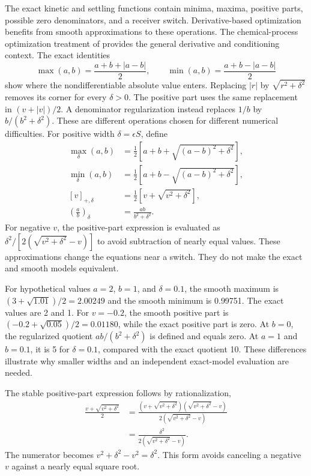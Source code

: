The exact kinetic and settling functions contain minima, maxima, positive parts, possible zero denominators, and a receiver switch. Derivative-based optimization benefits from smooth approximations to these operations. The chemical-process optimization treatment of \citet{BuzziFerraris2013} provides the general derivative and conditioning context. The exact identities
\begin{equation}
\max(a,b)=\frac{a+b+|a-b|}{2},\qquad
\min(a,b)=\frac{a+b-|a-b|}{2}
\end{equation}
show where the nondifferentiable absolute value enters. Replacing $|r|$ by $\sqrt{r^2+\delta^2}$ removes its corner for every $\delta>0$. The positive part uses the same replacement in $(v+|v|)/2$. A denominator regularization instead replaces $1/b$ by $b/(b^2+\delta^2)$. These are different operations chosen for different numerical difficulties. For positive width $\delta=\epsilon S$, define
\begin{align}
\max_\delta(a,b)&=\tfrac12\left[a+b+\sqrt{(a-b)^2+\delta^2}\right],\\
\min_\delta(a,b)&=\tfrac12\left[a+b-\sqrt{(a-b)^2+\delta^2}\right],\\
[v]_{+,\delta}&=\tfrac12\left[v+\sqrt{v^2+\delta^2}\right],\\
\left(\frac ab\right)_\delta&=\frac{ab}{b^2+\delta^2}.
\label{eq:plant_smooth_operations}
\end{align}
For negative $v$, the positive-part expression is evaluated as $\delta^2/[2(\sqrt{v^2+\delta^2}-v)]$ to avoid subtraction of nearly equal values. These approximations change the equations near a switch. They do not make the exact and smooth models equivalent.

For hypothetical values $a=2$, $b=1$, and $\delta=0.1$, the smooth maximum is $(3+\sqrt{1.01})/2=2.00249$ and the smooth minimum is 0.99751. The exact values are 2 and 1. For $v=-0.2$, the smooth positive part is $(-0.2+\sqrt{0.05})/2=0.01180$, while the exact positive part is zero. At $b=0$, the regularized quotient $ab/(b^2+\delta^2)$ is defined and equals zero. At $a=1$ and $b=0.1$, it is 5 for $\delta=0.1$, compared with the exact quotient 10. These differences illustrate why smaller widths and an independent exact-model evaluation are needed.

The stable positive-part expression follows by rationalization,
\begin{align}
\frac{v+\sqrt{v^2+\delta^2}}2
&=\frac{(v+\sqrt{v^2+\delta^2})(\sqrt{v^2+\delta^2}-v)}
{2(\sqrt{v^2+\delta^2}-v)}\\
&=\frac{\delta^2}{2(\sqrt{v^2+\delta^2}-v)}.
\end{align}
The numerator becomes $v^2+\delta^2-v^2=\delta^2$. This form avoids canceling a negative $v$ against a nearly equal square root.

